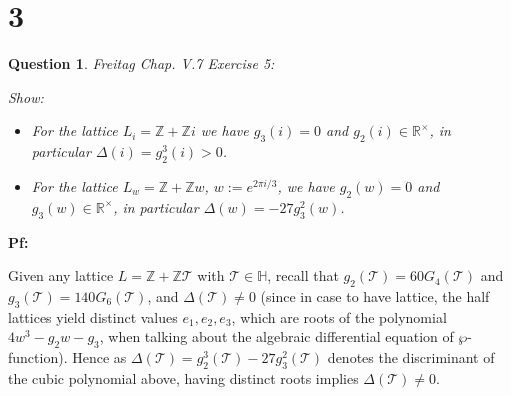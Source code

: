 \documentclass{article}
\newtheorem{question}{Question}
\begin{document}
\break

\section*{3}
\begin{myBox}[]{}
    \begin{question}
        Freitag Chap. V.7 Exercise 5:

        Show:
        \begin{itemize}
            \item[(a)] For the lattice $L_i=\mathbb{Z}+\mathbb{Z}i$ we have $g_3(i)=0$ and $g_2(i)\in\mathbb{R}^\times$, in particular $\Delta(i)=g_2^3(i)>0$.
            \item[(b)] For the lattice $L_w=\mathbb{Z}+\mathbb{Z}w$, $w:=e^{2\pi i/3}$, we have $g_2(w)=0$ and $g_3(w)\in\mathbb{R}^\times$, in particular $\Delta(w)=-27g_3^2(w)$. 
        \end{itemize}
    \end{question}
\end{myBox}

\textbf{Pf:}

Given any lattice $L=\mathbb{Z}+\mathbb{Z}\mathcal{T}$ with $\mathcal{T}\in\mathbb{H}$, recall that $g_2(\mathcal{T}) = 60G_4(\mathcal{T})$ and $g_3(\mathcal{T})=140G_6(\mathcal{T})$, and $\Delta(\mathcal{T}) \neq 0$ (since in case to have lattice, the half lattices yield distinct values $e_1,e_2,e_3$, which are roots of the polynomial $4w^3-g_2w-g_3$, when talking about the algebraic differential equation of $\wp$-function). Hence as $\Delta(\mathcal{T})=g_2^3(\mathcal{T})-27g_3^2(\mathcal{T})$ denotes the discriminant of the cubic polynomial above, having distinct roots implies $\Delta(\mathcal{T})\neq 0$.
\end{document}
